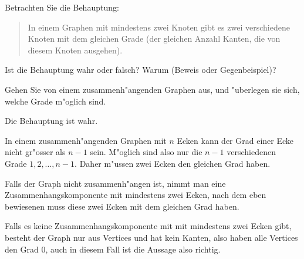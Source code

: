 Betrachten Sie die Behauptung:
\begin{quote}
In einem Graphen mit mindestens zwei Knoten gibt es zwei verschiedene Knoten
mit dem gleichen Grade (der gleichen Anzahl Kanten, die von diesem
Knoten ausgehen).
\end{quote}
Ist die Behauptung wahr oder falsch? Warum (Beweis
oder Gegenbeispiel)?

\begin{hinweis}
Gehen Sie von einem zusammenh"angenden Graphen
aus, und "uberlegen sie sich, welche Grade m"oglich sind.
\end{hinweis}

\begin{loesung}
Die Behauptung ist wahr.

In einem zusammenh"angenden Graphen mit $n$
Ecken kann der Grad einer Ecke nicht gr"osser als $n-1$ sein.
M"oglich sind also nur die $n-1$ verschiedenen Grade
$1,2,\dots,n-1$. Daher m"ussen zwei Ecken den gleichen Grad
haben.

Falls der Graph nicht zusammenh"angen ist, nimmt man eine
Zusammenhangskomponente mit mindestens zwei Ecken, nach dem
eben bewiesenen muss diese zwei Ecken mit dem gleichen
Grad haben.

Falls es keine Zusammenhangskomponente mit mit mindestens
zwei Ecken gibt, besteht der Graph nur aus Vertices und hat
kein Kanten, also haben alle Vertices den Grad $0$, auch
in diesem Fall ist die Aussage also richtig.
\end{loesung}
